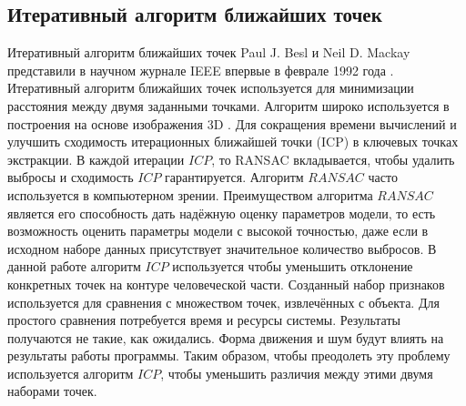 \subsection{Итеративный алгоритм ближайших точек}
Итеративный алгоритм ближайших точек Paul J. Besl и Neil D. Mackay представили в научном журнале IEEE впервые в феврале 1992 года \cite{Besl1992}. Итеративный алгоритм ближайших точек  используется для минимизации расстояния между двумя заданными точками. Алгоритм широко используется в построения на основе изображения 3D \cite{Gelfan2003, Rusinkiewicz2001}. Для сокращения времени вычислений и улучшить сходимость итерационных ближайшей точки (ICP) в ключевых точках экстракции. В каждой итерации $ICP$, то RANSAC \cite{Hast2013} вкладывается, чтобы удалить выбросы и сходимость $ICP$ гарантируется.  Алгоритм $RANSAC$ часто используется в компьютерном зрении. Преимуществом алгоритма $RANSAC$ является его способность дать надёжную оценку параметров модели, то есть возможность оценить параметры модели с высокой точностью, даже если в исходном наборе данных присутствует значительное количество выбросов.
В данной работе алгоритм $ICP$ используется чтобы уменьшить отклонение конкретных точек на контуре человеческой части. Созданный набор признаков используется для сравнения с множеством точек, извлечённых с объекта. Для простого сравнения потребуется время и ресурсы системы. Результаты получаются не такие, как ожидались. Форма движения и шум будут влиять на результаты работы программы. Таким образом, чтобы преодолеть эту проблему используется алгоритм $ICP$, чтобы уменьшить различия между этими двумя наборами точек.

